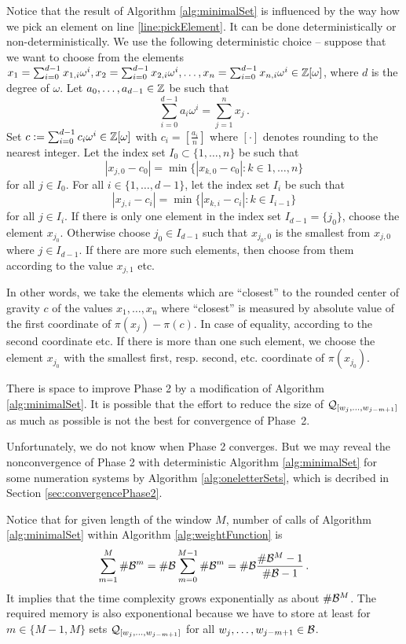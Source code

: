 Notice that the result of Algorithm \ref{alg:minimalSet} is influenced by the way how we pick an element on line \ref{line:pickElement}. It can be done deterministically or non-deterministically. We use the following deterministic choice -- suppose that we want to choose from the elements $x_1=\sum_{i=0}^{d-1}x_{1,i}\omega^i, x_2=\sum_{i=0}^{d-1}x_{2,i}\omega^i, \dots,x_n=\sum_{i=0}^{d-1}x_{n,i}\omega^i\in\mathbb{Z}[\omega]$, where $d$ is the degree of $\omega$. Let $a_0,\dots,a_{d-1}\in\mathbb{Z}$ be such that 
$$
\sum_{i=0}^{d-1}a_i\omega^i=\sum_{j=1}^n x_j\,.
$$ 
Set $c:=\sum_{i=0}^{d-1}c_i\omega^i \in\mathbb{Z}[\omega]$ with $c_i=[\frac{a_i}{n}]$ where $[\cdot]$ denotes rounding to the nearest integer. Let the index set $I_0\subset\{1,\dots,n\}$ be such that 
$$
|x_{j,0}-c_0|=\min\{|x_{k,0}-c_0|\colon k\in{1,\dots,n}\}
$$
for all $j\in I_0$. For all $i\in\{1,\dots,d-1\}$, let the index set $I_i$ be such that
$$
|x_{j,i}-c_i|=\min\{|x_{k,i}-c_i|\colon k\in I_{i-1}\}
$$
for all $j\in I_i$. If there is only one element in the index set $I_{d-1}=\{j_0\}$, choose the element $x_{j_0}$. Otherwise choose $j_0\in I_{d-1}$ such that $x_{j_0,0}$ is the smallest from $x_{j,0}$ where $j\in I_{d-1}$. If there are more such elements, then choose from them according to the value $x_{j,1}$ etc. 

In other words, we take the elements which are ``closest'' to the rounded center of gravity $c$ of the values $x_1,\dots,x_n$ where ``closest'' is measured by absolute value of the first coordinate of $\pi(x_j)-\pi(c)$. In case of equality, according to the second coordinate etc. If there is more than one such element, we choose the element $x_{j_0}$ with the smallest first, resp. second, etc. coordinate of $\pi(x_{j_0})$.  

There is space to improve Phase 2 by a modification of Algorithm \ref{alg:minimalSet}. It is possible that the effort to reduce the size of  $\mathcal{Q}_{[w_j,\dots, w_{j-m+1}]}$ as much as possible is not the best for convergence of Phase~2.

Unfortunately, we do not know when Phase 2 converges. But  we may reveal the nonconvergence of Phase 2 with deterministic Algorithm \ref{alg:minimalSet} for some numeration systems by Algorithm \ref{alg:oneletterSets}, which is decribed in Section \ref{sec:convergencePhase2}.



Notice that for given length of the window $M$, number of calls of Algorithm \ref{alg:minimalSet} within Algorithm \ref{alg:weightFunction} is
$$
\sum_{m=1}^M  \#\mathcal{B}^m = \#\mathcal{B} \sum_{m=0}^{M-1}  \#\mathcal{B}^m = \#\mathcal{B} \frac{\#\mathcal{B}^M-1}{\#\mathcal{B}-1}\,.
$$    
It implies that the time complexity grows exponentially as about $\#\mathcal{B}^M$. The required memory is also exponentional because we have to store at least for $m\in\{M-1,M\}$ sets $\mathcal{Q}_{[w_j,\dots, w_{j-m+1}]}$ for all $w_j,\dots, w_{j-m+1} \in \mathcal{B}$.

